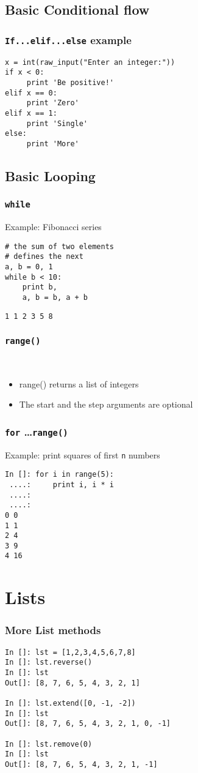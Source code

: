 \documentclass[14pt,compress]{beamer}
\newcounter{time}
\newcommand{\inctime}[1]{\addtocounter{time}{#1}{\tiny \thetime\ m}}
\newcommand{\typ}[1]{\texttt{#1}}
\newcommand{\kwrd}[1]{ \texttt{\textbf{\color{blue}{#1}}}  }
\begin{document}
\subsection{Basic Conditional flow}
\begin{frame}[fragile]
  \frametitle{\typ{If...elif...else} example}
\begin{lstlisting}
x = int(raw_input("Enter an integer:"))
if x < 0:
     print 'Be positive!'
elif x == 0:
     print 'Zero'
elif x == 1:
     print 'Single'
else:
     print 'More'
\end{lstlisting}
\end{frame}

\subsection{Basic Looping}
\begin{frame}[fragile]
  \frametitle{\typ{while}}
Example: Fibonacci series
  \begin{lstlisting}
# the sum of two elements
# defines the next
a, b = 0, 1
while b < 10:
    print b,
    a, b = b, a + b 
\end{lstlisting}
\typ{1 1 2 3 5 8}\\  
\end{frame}

\begin{frame}[fragile]
\frametitle{\typ{range()}}
\kwrd{range([start,] stop[, step])}\\
\begin{itemize}
  \item \alert {range() returns a list of integers}
  \item \alert {The start and the step arguments are optional}  
\end{itemize}
\end{frame}

\begin{frame}[fragile]
  \frametitle{\typ{for} \ldots \typ{range()}}
Example: print squares of first \typ{n} numbers
  \begin{lstlisting}
In []: for i in range(5):
 ....:     print i, i * i
 ....:     
 ....:     
0 0
1 1
2 4
3 9
4 16
\end{lstlisting}
\inctime{15}
\end{frame}

\section{Lists}
\begin{frame}[fragile]
\frametitle{More List methods}
\begin{lstlisting}
In []: lst = [1,2,3,4,5,6,7,8]
In []: lst.reverse()
In []: lst
Out[]: [8, 7, 6, 5, 4, 3, 2, 1]

In []: lst.extend([0, -1, -2])
In []: lst
Out[]: [8, 7, 6, 5, 4, 3, 2, 1, 0, -1]

In []: lst.remove(0)
In []: lst
Out[]: [8, 7, 6, 5, 4, 3, 2, 1, -1]
\end{lstlisting}
\end{frame}
\end{document}
